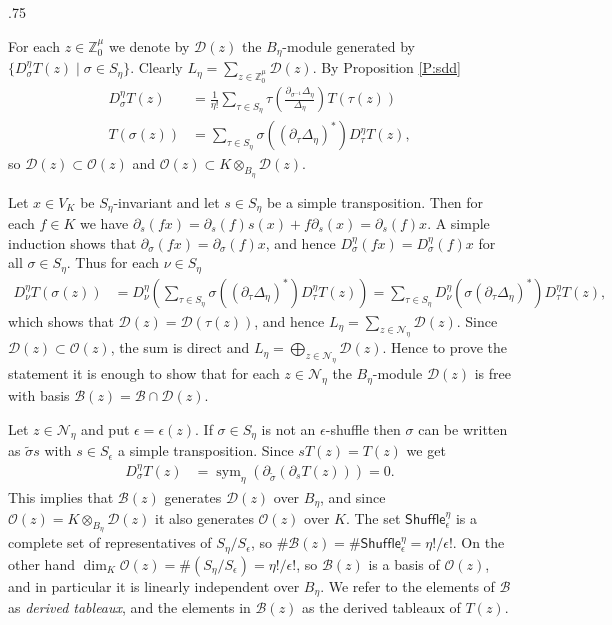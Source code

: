 \documentclass[11pt,fleqn]{article}
\makeatletter
\renewenvironment{proof}[1][\textit{Proof}]{\par
  \pushQED{\qed}%
  \normalfont \topsep.75\paraskip\relax
  \trivlist
  \item[\hskip\labelsep
        \itshape
    #1\@addpunct{.}]\ignorespaces
}{%
  \popQED\endtrivlist\@endpefalse
}
\newcommand\ZZ{\mathbb Z}
\newcommand\DD{\mathcal D}
\newcommand\N{\mathcal N}
\renewcommand\O{\mathcal O}
\newcommand\ot{\otimes}
\newcommand\Shuffle{\mathsf{Shuffle}}
\DeclareMathOperator\sym{sym}
\makeatother
\begin{document}
\begin{proof}
For each $z \in \ZZ^\mu_0$ we denote by $\DD(z)$ the $B_\eta$-module generated 
by $\{D_\sigma^\eta T(z) \mid \sigma \in S_\eta \}$. 
Clearly $L_\eta = \sum_{z \in \ZZ_0^\mu} \DD(z)$. By Proposition \ref{P:sdd}
\begin{align*}
D_\sigma^\eta T(z)
  &= \frac{1}{\eta!}\sum_{\tau \in S_\eta} \tau \left(
    \frac{\partial_{\sigma^{-1}}\Delta_\eta}{\Delta_\eta} 
    \right) T(\tau(z)) \\
T(\sigma (z)) &= \sum_{\tau \in S_\eta} \sigma((\partial_{\tau} \Delta_\eta)^*)
  D_\tau^\eta T(z),
\end{align*}
so $\DD(z) \subset \O(z)$ and $\O(z) \subset K \ot_{B_\eta} \DD(z)$. 

Let $x \in V_K$ be $S_\eta$-invariant and let $s \in S_\eta$ be a simple 
transposition. Then for each $f \in K$ we have $\partial_s(f x) = 
\partial_s(f) s(x) +  f \partial_s(x) = \partial_s(f) x$. A simple induction 
shows that $\partial_\sigma(fx) = \partial_\sigma(f) x$, and hence 
$D_\sigma^\eta(f x) = D_\sigma^\eta(f) x$ for all $\sigma \in S_\eta$.
Thus for each $\nu \in S_\eta$
\begin{align*}
D_\nu^\eta T(\sigma (z))
  &= D_\nu^\eta \left(
    \sum_{\tau \in S_\eta} \sigma((\partial_{\tau} \Delta_\eta)^*)
  D_\tau^\eta T(z)
  \right)
  = \sum_{\tau \in S_\eta} D_\nu^\eta(\sigma(\partial_{\tau} \Delta_\eta)^* )
  D_\tau^\eta T(z),
\end{align*}
which shows that $\DD(z) = \DD(\tau(z))$, and hence $L_\eta = \sum_{z \in 
\N_\eta} \DD(z)$. Since $\DD(z) \subset \O(z)$, the sum is direct and 
$L_\eta = \bigoplus_{z \in \N_\eta} \DD(z)$. Hence to prove the statement it 
is enough to show that for each $z \in \N_\eta$ the $B_\eta$-module $\DD(z)$ 
is free with basis $\mathcal B(z) = \mathcal B \cap \DD(z)$.

Let $z \in \N_\eta$ and put $\epsilon = \epsilon(z)$. If $\sigma \in S_\eta$ 
is not an $\epsilon$-shuffle then $\sigma$ can be written as $\tilde \sigma s$ 
with $s \in S_{\epsilon}$ a simple transposition. Since $s T(z) = T(z)$
we get
\begin{align*}
D_\sigma^\eta T(z) 
  &= \sym_\eta (\partial_{\tilde \sigma} (\partial_s T(z))) = 0.
\end{align*}
This implies that $\mathcal B(z)$ generates $\DD(z)$ over $B_\eta$, and
since $\O(z) = K \ot_{B_\eta} \DD(z)$ it also generates $\O(z)$ over $K$.
The set $\Shuffle_{\epsilon}^\eta$ is a complete set of representatives of 
$S_\eta / S_{\epsilon}$, so $\# \mathcal B(z) = \# \Shuffle_{\epsilon}^\eta = 
\eta!/\epsilon!$. On the other hand $\dim_K \O(z) = \# (S_\eta / S_\epsilon) = 
\eta!/\epsilon!$, so $\mathcal B(z)$ is a basis of $\O(z)$, and in particular
it is linearly independent over $B_\eta$. 
\end{proof}
We refer to the elements of $\mathcal B$ as \emph{derived tableaux}, and the
elements in $\mathcal B(z)$ as the derived tableaux of $T(z)$.
\end{document}

